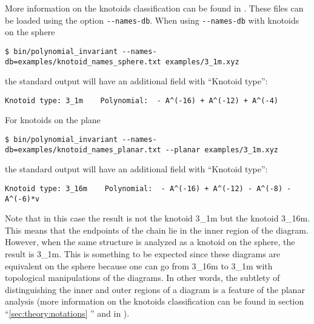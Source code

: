 More information on the knotoids classification can be found in \cite{goundaroulis2019}. These files can be loaded using the option  \lstinline{--names-db}.  When using \lstinline{--names-db} with knotoids on the sphere
\begin{lstlisting}
$ bin/polynomial_invariant --names-db=examples/knotoid_names_sphere.txt examples/3_1m.xyz
\end{lstlisting}
the standard output will have an additional field with ``Knotoid type'':
\begin{lstlisting}
Knotoid type: 3_1m    Polynomial:  - A^(-16) + A^(-12) + A^(-4)
\end{lstlisting}
For knotoids on the plane
\begin{lstlisting}
$ bin/polynomial_invariant --names-db=examples/knotoid_names_planar.txt --planar examples/3_1m.xyz
\end{lstlisting}
the standard output will have an additional field with ``Knotoid type'':
\begin{lstlisting}
Knotoid type: 3_16m    Polynomial:  - A^(-16) + A^(-12) - A^(-8) - A^(-6)*v
\end{lstlisting}
Note that in this case the result is not the knotoid 3\_1m but the knotoid 3\_16m. This means that the endpoints of the chain lie in the inner region of the diagram. However, when the same structure is analyzed as a knotoid on the sphere, the result is 3\_1m. This is something to be expected since these diagrams are equivalent on the sphere because one can go from 3\_16m to 3\_1m with topological manipulations of the diagrams. In other words, the subtlety of distinguishing the inner and outer regions of a diagram is a feature of the planar analysis (more information on the knotoids classification can be found in section ``\ref{sec:theory:notations} '' and in \cite{goundaroulis2019}). 

